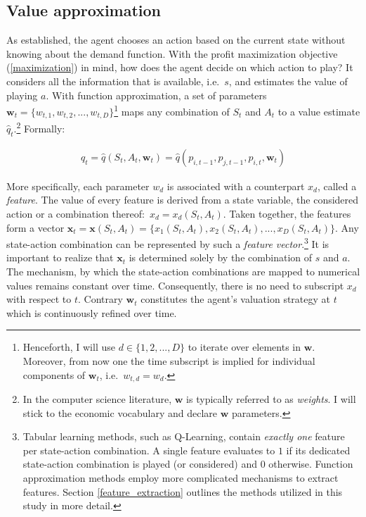 \subsection{Value approximation}\label{value_approximation}

As established, the agent chooses an action based on the current state without knowing about the demand function. With the profit maximization objective (\autoref{maximization}) in mind, how does the agent decide on which action to play? It considers all the information that is available, i.e.\ $s$, and estimates the value of playing $a$. With function approximation, a set of parameters $\boldsymbol{w}_t = \{w_{t, 1}, w_{t, 2}, ..., w_{t, D}\}$\footnote{Henceforth, I will use $d \in \{1, 2, ..., D\}$ to iterate over elements in $\boldsymbol{w}$. Moreover, from now one the time subscript is implied for individual components of $\boldsymbol{w}_t$, i.e.\ $w_{t,d} = w_d$. } maps any combination of $S_t$ and $A_t$ to a value estimate $\hat{q}_t$.\footnote{In the computer science literature, $\boldsymbol{w}$ is typically referred to as \emph{weights}. I will stick to the economic vocabulary and declare $\boldsymbol{w}$ parameters.} Formally:

\begin{gather}\label{q_estimation}
	\hat{q}_t = \hat{q}(S_t,A_t,\boldsymbol{w}_t) = \hat{q}(p_{i, t-1}, p_{j, t-1}, p_{i, t}, \boldsymbol{w}_t)
\end{gather}

More specifically, each parameter $w_d$ is associated with a counterpart $x_d$, called a \emph{feature}. The value of every feature is derived  from a state variable, the considered action or a combination thereof:\ $x_d = x_d(S_t, A_t)$. Taken together, the features form a vector $\boldsymbol{x}_t = \boldsymbol{x}(S_t, A_t) = \{x_1(S_t, A_t), x_2(S_t, A_t), ..., x_D(S_t, A_t)\}$. Any state-action combination can be represented by such a \emph{feature vector}.\footnote{Tabular learning methods, such as Q-Learning, contain \emph{exactly one} feature per state-action combination. A single feature evaluates to $1$ if its dedicated state-action combination is played (or considered) and $0$ otherwise. Function approximation methods employ more complicated mechanisms to extract features. Section \ref{feature_extraction} outlines the methods utilized in this study in more detail.} It is important to realize that $\boldsymbol{x}_t$ is determined solely by the combination of $s$ and $a$. The mechanism, by which the state-action combinations are mapped to numerical values remains constant over time. Consequently, there is no need to subscript $x_d$ with respect to $t$. Contrary $\boldsymbol{w}_t$ constitutes the agent's valuation strategy at $t$ which is continuously refined over time.

